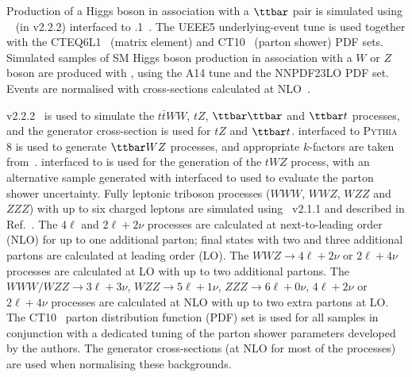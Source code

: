 Production of a Higgs boson in association with a $\ttbar$ pair is simulated using \AMCATNLO~\cite{Alwall:2014hca} 
(in \MADGRAPH v2.2.2) interfaced to .1~\cite{Corcella:2000bw}.  
The UEEE5 underlying-event tune is used together with the CTEQ6L1~\cite{Pumplin:2002vw} (matrix element) and CT10~\cite{Lai:2010vv} (parton shower) PDF sets.
Simulated samples of SM Higgs boson production in association with a $W$ or $Z$ boson are produced with , using the \textsc{A14} tune and the \textsc{NNPDF23LO} PDF set. Events are normalised with cross-sections calculated at NLO~\cite{Dittmaier:2012vm}.

\MADGRAPH v2.2.2~\cite{Alwall:2011uj} is used to simulate the $t\bar{t}WW$, $tZ$, $\ttbar\ttbar$ and $\ttbar t$ processes, and the generator cross-section is used for $tZ$ and $\ttbar t$. \MADGRAPH interfaced to \textsc{Pythia} 8 is used to generate $\ttbar WZ$ processes, and appropriate $k$-factors are taken from~\cite{Alwall:2014hca}. \AMCATNLO interfaced to  is used for the generation of the $tWZ$ process, with an alternative sample generated with \AMCATNLO interfaced to \HERWIG used to evaluate the parton shower uncertainty.  
Fully leptonic triboson processes ($WWW$, $WWZ$, $WZZ$ and $ZZZ$) with up to six charged leptons are simulated using \SHERPA~v2.1.1 
and described in Ref.~\cite{ATL-PHYS-PUB-2016-002}. 
The $4\ell$ and $2\ell+2\nu$ processes are calculated at next-to-leading order (NLO) for up to one additional parton; 
final states with two and three additional partons are calculated at leading order (LO). 
The $WWZ\to 4\ell+2\nu$ or $2\ell+4\nu$ processes are calculated at LO with up to two additional partons. 
The $WWW/WZZ\to 3\ell+3\nu$, $WZZ\to 5\ell+1\nu$, $ZZZ\to 6\ell+0\nu$, $4\ell+2\nu$ or $2\ell+4\nu$ processes 
are calculated at NLO with up to two extra partons at LO. 
The CT10~\cite{Lai:2010vv} parton distribution function (PDF) set is used for all \SHERPA samples in conjunction with 
a dedicated tuning of the parton shower parameters developed by the \SHERPA authors. 
The generator cross-sections (at NLO for most of the processes) are used when normalising these backgrounds.

